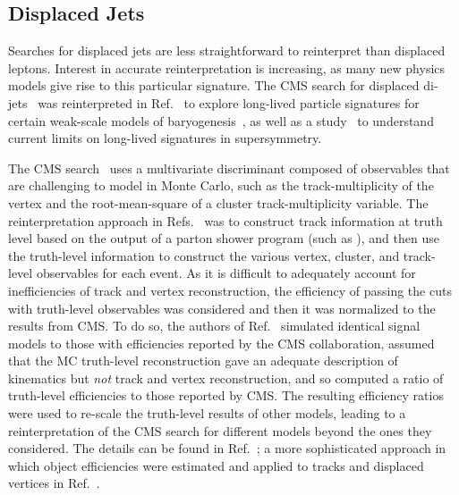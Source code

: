 \subsection{Displaced Jets}
\label{displacedJets}

Searches for displaced jets are less straightforward to reinterpret than
displaced leptons. Interest in accurate reinterpretation is increasing, as many
new physics models give rise to this particular signature. The CMS search for
displaced di-jets~\cite{CMS-PAS-EXO-12-038} was reinterpreted in Ref.~\cite{Cui:2014twa} to explore
long-lived particle signatures for certain weak-scale models of
baryogenesis~\cite{Cui:2012jh,Cui:2013bta,Cui:2014twa}, as well as a study~\cite{Liu:2015bma} to
understand current limits on long-lived signatures in supersymmetry.

The CMS search~\cite{Cui:2014twa}  uses a multivariate discriminant 
composed of observables that are
challenging to model in Monte Carlo, such as the  track-multiplicity of the vertex
and the root-mean-square of a cluster track-multiplicity variable. The
reinterpretation approach in Refs.~\cite{Cui:2014twa,Liu:2015bma} was to construct track
information at truth level based on the output of a parton shower program (such
as {}), and then use the truth-level information to construct the
various vertex, cluster, and track-level observables for each event. As it is
difficult to adequately account for inefficiencies of track and vertex
reconstruction, the efficiency of passing the cuts with truth-level observables
was considered and then it was normalized to the results from CMS. To do so, the
authors of Ref.~\cite{Cui:2014twa}
simulated identical signal models to those with efficiencies reported by the CMS
collaboration, assumed that the MC truth-level reconstruction gave an adequate
description of kinematics but \emph{not} track and vertex reconstruction, and so
computed a ratio of truth-level efficiencies to those reported by CMS. The resulting
 efficiency ratios were used to re-scale the truth-level results of other models,
leading to a reinterpretation of the CMS search for different models beyond the
ones they considered. The details can be found in Ref.~\cite{Cui:2014twa};
 a more sophisticated approach in which object efficiencies were estimated and applied
to tracks and displaced vertices in Ref.~\cite{Liu:2015bma}.

